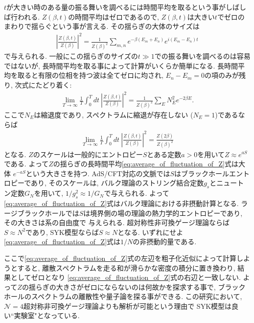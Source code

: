$t$が大きい時のある量の振る舞いを調べるには時間平均を取るという事がしばしば行われる. 
$Z(\beta, t)$の時間平均はゼロであるので, $Z(\beta, t)$は大きい$t$でゼロのまわりで揺らぐという事が言える. 
その揺らぎの大体のサイズは
\begin{align}
	\left|\frac{Z(\beta, t)}{Z(\beta)}\right|^2
	= \frac{1}{Z(\beta)^2}\sum_{m,n}e^{-\beta(E_m + E_n)}e^{i(E_m - E_n)t}
\end{align}
で与えられる. 
一般にこの揺らぎのサイズの$t \gg 1$での振る舞いを調べるのは容易ではないが, 
長時間平均を取る事によって計算がいくらか簡単になる. 
長時間平均を取ると有限の位相を持つ波は全てゼロに均され, $E_n-E_m = 0$の項のみが残り, 次式にたどり着く:
\begin{align}
	\lim_{T\to\infty}\frac{1}{T}\int_0^Tdt\ \left|\frac{Z(\beta, t)}{Z(\beta)}\right|^2
	= \frac{1}{Z(\beta)^2}\sum_E N_E^2e^{-2\beta E}.
\end{align}
ここで$N_E$は縮退度であり, スペクトラムに縮退が存在しない ($N_E = 1$)であるならば
\begin{align}
	\lim_{T\to\infty}\frac{1}{T}\int_0^Tdt\ \left|\frac{Z(\beta, t)}{Z(\beta)}\right|^2
	= \frac{Z(2\beta)}{Z(\beta)^2}
	\label{eq:average_of_fluctuation_of_Z}
\end{align} 
となる. 
$Z$のスケールは一般的にエントロピー$S$とある定数$a > 0$を用いて$Z \approx e^{aS}$である. 
よって$Z$の揺らぎの長時間平均\eqref{eq:average_of_fluctuation_of_Z}式は大体
$e^{-aS}$という大きさを持つ. 
AdS/CFT対応の文脈では$S$はブラックホールエントロピーであり, そのスケールは, 
バルク理論のストリング結合定数$g_s$とニュートン定数$G_N$を用いて, $1/g_s^2 \approx 1/G_N$で与えられる. 
よって\eqref{eq:average_of_fluctuation_of_Z}式はバルク理論における非摂動計算となる. 
ラージブラックホールでは$S$は境界側の場の理論の熱力学的エントロピーであり, その大きさは系の自由度で
与えられる. 
超対称性非可換ゲージ理論ならば$S\approx N^2$であり, SYK模型ならば$S\approx N$となる. 
いずれにせよ\eqref{eq:average_of_fluctuation_of_Z}式は$1/N$の非摂動的量である. 

ここで\eqref{eq:average_of_fluctuation_of_Z}式の左辺を粗子化近似によって計算しようとすると, 
離散スペクトラムを走る和が滑らかな密度の積分に置き換わり, 結果としてゼロとなり
\eqref{eq:average_of_fluctuation_of_Z}式の右辺と一致しない. 
よって$Z$の揺らぎの大きさがゼロにならないのは何故かを探求する事で, 
ブラックホールのスペクトラムの離散性や量子論を探る事ができる. 
この研究において, $\mathcal{N}=4$超対称非可換ゲージ理論よりも解析が可能という理由で
SYK模型は良い``実験室"となっている. 

